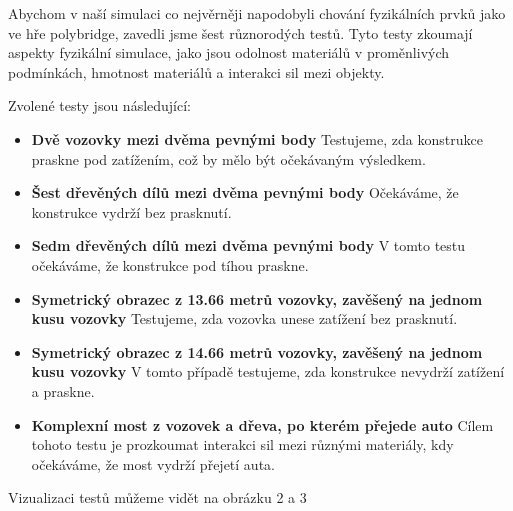 Abychom v naší simulaci co nejvěrněji napodobyli chování fyzikálních prvků jako ve hře polybridge, zavedli jsme šest různorodých testů. Tyto testy zkoumají aspekty fyzikální simulace, jako jsou odolnost materiálů v proměnlivých podmínkách, hmotnost materiálů a interakci sil mezi objekty.

Zvolené testy jsou následující:

\begin{itemize}
    \item \textbf{Dvě vozovky mezi dvěma pevnými body} Testujeme, zda konstrukce praskne pod zatížením, což by mělo být očekávaným výsledkem.
    \item \textbf{Šest dřevěných dílů mezi dvěma pevnými body} Očekáváme, že konstrukce vydrží bez prasknutí.
    \item \textbf{Sedm dřevěných dílů mezi dvěma pevnými body} V tomto testu očekáváme, že konstrukce pod tíhou praskne.
    \item \textbf{Symetrický obrazec z 13.66 metrů vozovky, zavěšený na jednom kusu vozovky} Testujeme, zda vozovka unese zatížení bez prasknutí.
    \item \textbf{Symetrický obrazec z 14.66 metrů vozovky, zavěšený na jednom kusu vozovky} V tomto případě testujeme, zda konstrukce nevydrží zatížení a praskne.
    \item \textbf{Komplexní most z vozovek a dřeva, po kterém přejede auto} Cílem tohoto testu je prozkoumat interakci sil mezi různými materiály, kdy očekáváme, že most vydrží přejetí auta.
\end{itemize}

Vizualizaci testů můžeme vidět na obrázku 2 a 3

